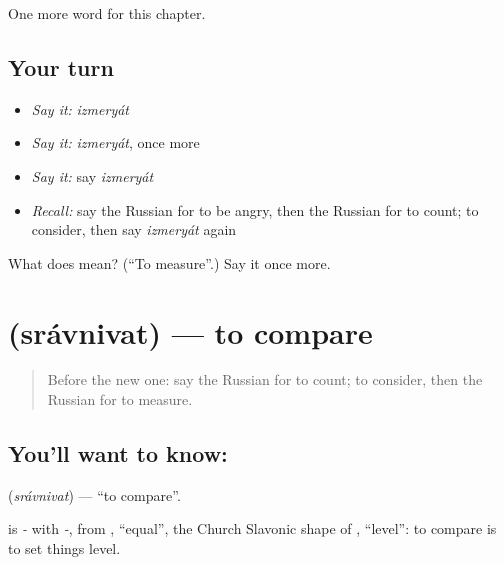 \begin{grammarlens}[title={What you've built}]
One more word for this chapter.
\end{grammarlens}

\subsection*{Your turn}
\begin{itemize}
\raggedright
  \item \emph{Say it:} \emph{izmeryát}
  \item \emph{Say it:} \emph{izmeryát}, once more
  \item \emph{Say it:} say \emph{izmeryát}
  \item \emph{Recall:} say the Russian for to be angry, then the Russian for to count; to consider, then say \emph{izmeryát} again
\end{itemize}

\begin{tcolorbox}[breakable,colback=teal!4,colframe=teal!35!black,title={Before you move on}]
What does  mean? (\textquotedblleft{}To measure\textquotedblright{}.) Say it once more.
\end{tcolorbox}
\section[\texorpdfstring{\ru{сравнивать} (srávnivat)}{сравнивать (srávnivat)}]{ (srávnivat) — to compare}

\label{lesson:RU-C236-sravnivat}



\begin{quote}
Before the new one: say the Russian for to count; to consider, then the Russian for to measure.
\end{quote}

\subsection*{You'll want to know: }
\textbf{} (\emph{srávnivat}) — \textquotedblleft{}to compare\textquotedblright{}.

\begin{cousinweb}
\textbf{} is \emph{-} with \emph{-}, from \emph{}, \textquotedblleft{}equal\textquotedblright{}, the Church Slavonic shape of \emph{}, \textquotedblleft{}level\textquotedblright{}: to compare is to set things level.
\end{cousinweb}


